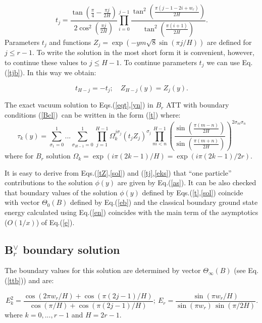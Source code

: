 \documentclass[a4paper,12pt,titlepage,final]{article}
\begin{document}
\begin{equation}
t_{j}=\frac{\tan (\frac{\pi }{4}-\frac{\pi j}{2H})}{2\cos ^{2}(\frac{\pi j}
{2H})}\prod_{i=0}^{j-1}\frac{\tan ^{2}(\frac{\pi (j-1-2i+w_{r})}{2H})}
{\tan^{2}(\frac{\pi (i+1)}{2H})}.  \label{tjb}
\end{equation}
Parameters $t_{j}$ and functions $Z_{j}=\exp (-ym\sqrt{8}\sin (\pi j/H))$
are defined for $j\leq r-1$. To write the solution in the most short form it
is convenient, however, to continue these values to $j\leq H-1$. To continue
parameters $t_{j}$ we can use Eq.(\ref{tjb}). In this way we obtain:

\begin{equation}
t_{H-j}=-t_{j};\quad Z_{H-j}(y)=Z_{j}(y).  \label{tZ}
\end{equation}

The exact vacuum solution to Eqs.(\ref{eqt},\ref{yn}) in $B_{r}$ ATT with
boundary conditions (\ref{Bcl})\ can be written in the form (\ref{t})
where:
\begin{equation}
\tau _{k}(y)=\sum_{\sigma _{1}=0}^{1}...\sum_{\sigma
_{H-1}=0}^{1}\prod_{j=1}^{H-1}\Omega _{k}^{j\sigma _{j}}(t_{j}Z_{j})^{\sigma
_{j}}\prod_{m<n}^{H-1}\left( \frac{\sin \left( \frac{\pi (m-n)}{2H}\right) }
{\sin \left( \frac{\pi (m+n)}{2H}\right) }\right) ^{2\sigma _{m}\sigma _{n}}
\label{sol}
\end{equation}
where for $B_{r}$ solution $\Omega _{k}=\exp (i\pi (2k-1)/H)=\exp (i\pi
(2k-1)/2r)$.

It is easy to derive from Eqs.(\ref{tZ},\ref{sol}) and (\ref{tj},\ref{eks})
that ``one particle'' contributions to the solution $\phi (y)$ are given by
Eq.(\ref{as}).
It can be also checked that boundary values of
the solution $\phi (y)$ defined by
Eqs.(\ref{t},\ref{sol}) coincide with vector $\Theta _{0}(B)$ defined by
Eq.(\ref{eb}) and the classical boundary ground state energy calculated
using
Eq.(\ref{en}) coincides with the main term of the asymptotics ($O(1/x)$) of
Eq.(\ref{e}).

\subsection{B$_{r}^{\vee }$ boundary solution}

The boundary values for this solution are determined by vector
$\Theta_{\infty }(B)$ (see Eq.(\ref{ttb})) and are:

\begin{equation}
E_{k}^{2}=\frac{\cos (2\pi w_{r}/H)+\cos (\pi (2j-1)/H)}{\cos (\pi /H)+\cos
(\pi (2j-1)/H)};~E_{r}=\frac{\sin (\pi w_{r}/H)}{\sin (\pi w_{r})
\,\sin (\pi/2H)}.  \label{bde}
\end{equation}
where $k=0,...,r-1$ and $H=2r-1$.
\end{document}
